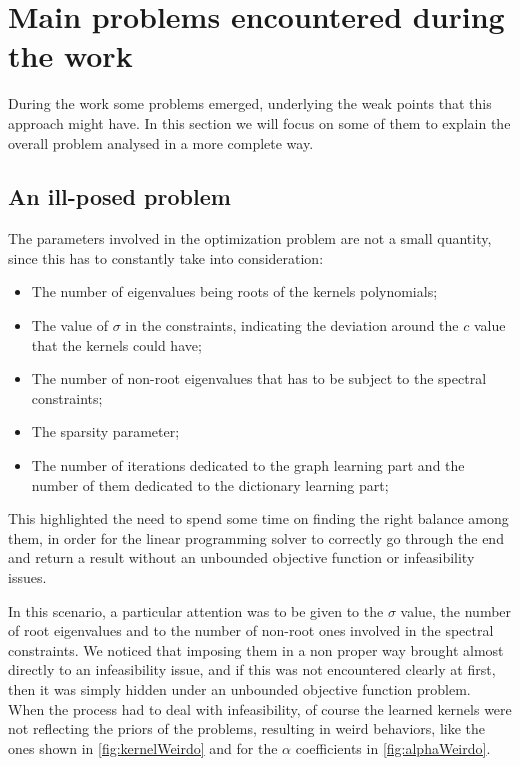 \chapter{Main problems encountered during the work}
During the work some problems emerged, underlying the weak points that this approach might have. In this section we will focus on some of them to explain the overall problem analysed in a more complete way.

\section{An ill-posed problem}
The parameters involved in the optimization problem are not a small quantity, since this has to constantly take into consideration:
\begin{itemize}
  \item The number of eigenvalues being roots of the kernels polynomials;
  \item The value of $\sigma$ in the constraints, indicating the deviation around the $c$ value that the kernels could have;
  \item The number of non-root eigenvalues that has to be subject to the spectral constraints;
  \item The sparsity parameter;
  \item The number of iterations dedicated to the graph learning part and the number of them dedicated to the dictionary learning part;
\end{itemize}
This highlighted the need to spend some time on finding the right balance among them, in order for the linear programming solver to correctly go through the end and return a result without an unbounded objective function or infeasibility issues.

In this scenario, a particular attention was to be given to the $\sigma$ value, the number of root eigenvalues and to the number of non-root ones involved in the spectral constraints. We noticed that imposing them in a non proper way brought almost directly to an infeasibility issue, and if this was not encountered clearly at first, then it was simply hidden under an unbounded objective function problem.\\
When the process had to deal with infeasibility, of course the learned kernels were not reflecting the priors of the problems, resulting in weird behaviors, like the ones shown in \autoref{fig:kernelWeirdo} and for the $\alpha$ coefficients in \autoref{fig:alphaWeirdo}.

